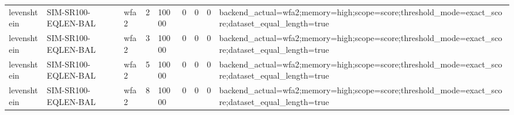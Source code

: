 \begin{tabular}{lllllllll}
levenshtein & SIM-SR100-EQLEN-BAL & wfa2 & 2 & 10000 & 0 & 0 & 0 & backend\_actual=wfa2;memory=high;scope=score;threshold\_mode=exact\_score;dataset\_equal\_length=true \\
levenshtein & SIM-SR100-EQLEN-BAL & wfa2 & 3 & 10000 & 0 & 0 & 0 & backend\_actual=wfa2;memory=high;scope=score;threshold\_mode=exact\_score;dataset\_equal\_length=true \\
levenshtein & SIM-SR100-EQLEN-BAL & wfa2 & 5 & 10000 & 0 & 0 & 0 & backend\_actual=wfa2;memory=high;scope=score;threshold\_mode=exact\_score;dataset\_equal\_length=true \\
levenshtein & SIM-SR100-EQLEN-BAL & wfa2 & 8 & 10000 & 0 & 0 & 0 & backend\_actual=wfa2;memory=high;scope=score;threshold\_mode=exact\_score;dataset\_equal\_length=true \\
\hline
\end{tabular}
